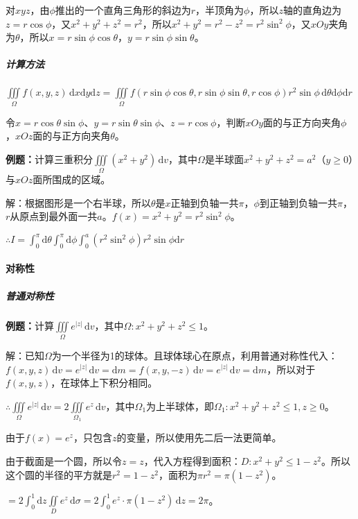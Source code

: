 \documentclass[UTF8, 12pt]{ctexart}
\begin{document}
对$xyz$，由$\phi$推出的一个直角三角形的斜边为$r$，半顶角为$\phi$，所以$z$轴的直角边为$z=r\cos\phi$，又$x^2+y^2+z^2=r^2$，所以$x^2+y^2=r^2-z^2=r^2\sin^2\phi$，又$xOy$夹角为$\theta$，所以$x=r\sin\phi\cos\theta$，$y=r\sin\phi\sin\theta$。

\subparagraph{计算方法} \leavevmode \medskip

$\iiint\limits_\Omega f(x,y,z)\,\textrm{d}x\textrm{d}y\textrm{d}z=\iiint\limits_\Omega f(r\sin\phi\cos\theta,r\sin\phi\sin\theta,r\cos\phi)r^2\sin\phi\,\textrm{d}\theta\textrm{d}\phi\textrm{d}r$

令$x=r\cos\theta\sin\phi$、$y=r\sin\theta\sin\phi$、$z=r\cos\phi$，判断$xOy$面的与正方向夹角$\phi$，$xOz$面的与正方向夹角$\theta$。

\textbf{例题：}计算三重积分$\iiint\limits_\Omega(x^2+y^2)\,\textrm{d}v$，其中$\Omega$是半球面$x^2+y^2+z^2=a^2$（$y\geqslant0$）与$xOz$面所围成的区域。

解：根据图形是一个右半球，所以$\theta$是$x$正轴到负轴一共$\pi$，$\phi$到正轴到负轴一共$\pi$，$r$从原点到最外面一共$a$。$f(x)=x^2+y^2=r^2\sin^2\phi$。

$\therefore I=\int_0^\pi\textrm{d}\theta\int_0^\pi\textrm{d}\phi\int_0^a(r^2\sin^2\phi)r^2\sin\phi\textrm{d}r$

\paragraph{对称性} \leavevmode \medskip

\subparagraph{普通对称性} \leavevmode \medskip

\textbf{例题：}计算$\iiint\limits_\Omega e^{\vert z\vert}\,\textrm{d}v$，其中$\Omega:x^2+y^2+z^2\leqslant1$。

解：已知$\Omega$为一个半径为1的球体。且球体球心在原点，利用普通对称性代入：$f(x,y,z)\,\textrm{d}v=e^{\vert z\vert}\,\textrm{d}v=\textrm{d}m=f(x,y,-z)\,\textrm{d}v=e^{\vert z\vert}\,\textrm{d}v=\textrm{d}m$，所以对于$f(x,y,z)$，在球体上下积分相同。

$\therefore\iiint\limits_\Omega e^{\vert z\vert}\,\textrm{d}v=2\iiint\limits_{\Omega_1}e^z\,\textrm{d}v$，其中$\Omega_1$为上半球体，即$\Omega_1:x^2+y^2+z^2\leqslant1,z\geqslant0$。

由于$f(x)=e^z$，只包含$z$的变量，所以使用先二后一法更简单。

由于截面是一个圆，所以令$z=z$，代入方程得到面积：$D:x^2+y^2\leqslant1-z^2$。所以这个圆的半径的平方就是$r^2=1-z^2$，面积为$\pi r^2=\pi(1-z^2)$。

$=2\int_0^1\textrm{d}z\iint\limits_De^z\,\textrm{d}\sigma=2\int_0^1e^z\cdot\pi(1-z^2)\,\textrm{d}z=2\pi$。
\end{document}
